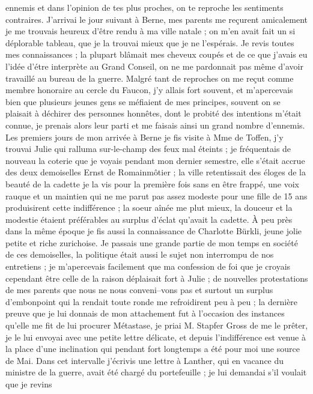 \documentclass[12pt]{article}
\begin{document}
 ennemis et dans l’opinion de tes plus proches, on
te reproche les sentiments contraires. J’arrivai le jour suivant à Berne, mes parents me reçurent
amicalement je me trouvais heureux d’être rendu à ma ville natale ; on m’en avait fait un si
déplorable tableau, que je la trouvai mieux que je ne l’espérais. Je revis toutes mes connaissances
; la plupart blâmait mes cheveux coupés et de ce que j’avais eu l’idée d’étre interprète au Grand
Conseil, on ne me pardonnait pas même d’avoir travaillé au bureau de la guerre. Malgré tant de
reproches on me reçut comme membre honoraire au cercle du Faucon, j’y allais fort souvent, et
m’apercevais bien que plusieurs jeunes gens se méfiaient de mes principes, souvent on se plaisait à
déchirer des personnes honnêtes, dont le probité des intentions m’était connue, je prenais alors
leur parti et me faisais ainsi un grand nombre d’ennemis. Les premiers jours de mon arrivée à Berne
je fis visite à Mme de Toffen, j’y trouvai Julie qui ralluma sur-le-champ des feux mal éteints ; je
fréquentais de nouveau la coterie que je voyais pendant mon dernier semestre, elle s’était accrue
des deux demoiselles Ernst de Romainmôtier ; la ville retentissait des éloges de la beauté de la
cadette je la vis pour la première fois sans en être frappé, une voix rauque et un maintien qui ne
me parut pas assez modeste pour une fille de 15 ans produisirent cette indifférence ; la soeur aînée
me plut mieux, la douceur et la modestie étaient préférables au surplus d’éclat qu’avait la cadette.
À peu près dans la même époque je fis aussi la connaissance de Charlotte Bürkli, jeune jolie petite
et riche zurichoise. Je passais une grande partie de mon temps en société de ces demoiselles, la
politique était aussi le sujet non interrompu de nos entretiens ; je m’apercevais facilement que ma
confession de foi que je croyais cependant être celle de la raison déplaisait fort à Julie ; de
nouvelles protestations de mes parents que nous ne nous conveni–vons pas et surtout un surplus
d’embonpoint qui la rendait toute ronde me refroidirent peu à peu ; la dernière preuve que je lui
donnais de mon attachement fut à l’occasion des instances qu’elle me fit de lui procurer Métastase,
je priai M. Stapfer Gross de me le prêter, je le lui envoyai avec une petite lettre délicate, et
depuis l’indifférence est venue à la place d’une inclination qui pendant fort longtemps a été pour
moi une source de Mai. Dans cet intervalle j’écrivis une lettre à Lanther, qui en vacance du
ministre de la guerre, avait été chargé du portefeuille ; je lui demandai s’il voulait que je revins
\end{document}
